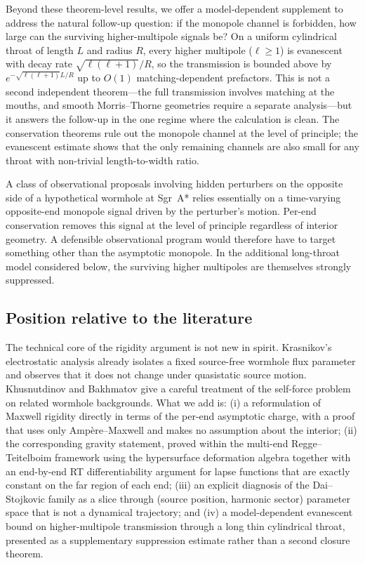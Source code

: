 \documentclass[aps,prd,onecolumn,nofootinbib,superscriptaddress]{revtex4-2}
\begin{document}
Beyond these theorem-level results, we offer a model-dependent supplement to address the natural follow-up question: if the monopole channel is forbidden, how large can the surviving higher-multipole signals be? On a uniform cylindrical throat of length $L$ and radius $R$, every higher multipole ($\ell \ge 1$) is evanescent with decay rate $\sqrt{\ell(\ell+1)}/R$, so the transmission is bounded above by $e^{-\sqrt{\ell(\ell+1)}L/R}$ up to $O(1)$ matching-dependent prefactors. This is not a second independent theorem---the full transmission involves matching at the mouths, and smooth Morris--Thorne geometries require a separate analysis---but it answers the follow-up in the one regime where the calculation is clean. The conservation theorems rule out the monopole channel at the level of principle; the evanescent estimate shows that the only remaining channels are also small for any throat with non-trivial length-to-width ratio.

A class of observational proposals involving hidden perturbers on the opposite side of a hypothetical wormhole at Sgr~A* relies essentially on a time-varying opposite-end monopole signal driven by the perturber's motion.\cite{DaiStojkovic2019Observing,SimonettiEtAl2021SensitiveSearches} Per-end conservation removes this signal at the level of principle regardless of interior geometry. A defensible observational program would therefore have to target something other than the asymptotic monopole. In the additional long-throat model considered below, the surviving higher multipoles are themselves strongly suppressed.

\subsection*{Position relative to the literature}

The technical core of the rigidity argument is not new in spirit. Krasnikov's electrostatic analysis already isolates a fixed source-free wormhole flux parameter and observes that it does not change under quasistatic source motion.\cite{Krasnikov2008ElectrostaticInteraction,Krasnikov2020CommentObserving} Khusnutdinov and Bakhmatov give a careful treatment of the self-force problem on related wormhole backgrounds.\cite{KhusnutdinovBakhmatov2007SelfForce} What we add is: (i) a reformulation of Maxwell rigidity directly in terms of the per-end asymptotic charge, with a proof that uses only Amp\`ere--Maxwell and makes no assumption about the interior; (ii) the corresponding gravity statement, proved within the multi-end Regge--Teitelboim framework using the hypersurface deformation algebra together with an end-by-end RT differentiability argument for lapse functions that are exactly constant on the far region of each end; (iii) an explicit diagnosis of the Dai--Stojkovic family as a slice through (source position, harmonic sector) parameter space that is not a dynamical trajectory; and (iv) a model-dependent evanescent bound on higher-multipole transmission through a long thin cylindrical throat, presented as a supplementary suppression estimate rather than a second closure theorem.
\end{document}
